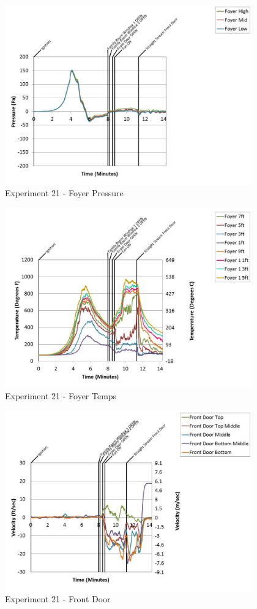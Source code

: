 \documentclass{article}
\begin{document}
\begin{appendices}
	\clearpage

	\begin{figure}[h!]
		\centering
		\includegraphics[height=3.05in]{0_Images/Results_Charts/Exp_21_Charts/FoyerPressure.pdf}
		\caption{Experiment 21 - Foyer Pressure}
	\end{figure}
 

	\begin{figure}[h!]
		\centering
		\includegraphics[height=3.05in]{0_Images/Results_Charts/Exp_21_Charts/FoyerTemps.pdf}
		\caption{Experiment 21 - Foyer Temps}
	\end{figure}
 
	\clearpage

	\begin{figure}[h!]
		\centering
		\includegraphics[height=3.05in]{0_Images/Results_Charts/Exp_21_Charts/FrontDoor.pdf}
		\caption{Experiment 21 - Front Door}
	\end{figure}
 


\end{appendices}
\end{document}
